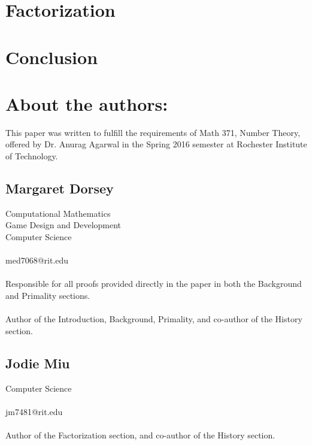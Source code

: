 \documentclass{article}
\begin{document}
\section*{Factorization}\label{Factorization}

\section*{Conclusion}\label{Conclusion}

\newpage

\nocite{*}
         






\section*{About the authors:}


\par This paper was written to fulfill the requirements of Math 371, Number Theory, offered by Dr. Anurag Agarwal
in the Spring 2016 semester at Rochester Institute of Technology.
\subsection*{Margaret Dorsey}
   Computational Mathematics
   \\Game Design and Development
   \\Computer Science
   \\
   \\ med7068@rit.edu
  \\
  \\ Responsible for all proofs provided directly in the paper in both the Background and Primality sections.
  \\
  \\ Author of the Introduction, Background, Primality, and  co-author of the History section.

\subsection*{Jodie Miu}
   Computer Science
   \\
   \\ jm7481@rit.edu 
   \\
   \\ Author of the Factorization section, and co-author of the History section.
   
\end{document}
